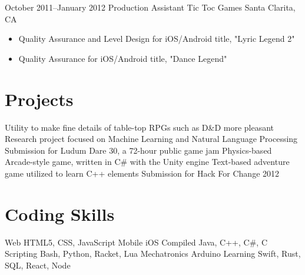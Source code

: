 \documentclass[11pt,a4paper,sans]{moderncv}        %
\begin{document}
\cventry
{October 2011--January 2012}	{Production Assistant}
{Tic Toc Games}	{Santa Clarita, CA}
{}
{
  \begin{itemize}
  \item Quality Assurance and Level Design for iOS/Android title, "Lyric Legend 2"
  \item Quality Assurance for iOS/Android title, "Dance Legend"
  \end{itemize}
}	%

\section{Projects}		%
             {Utility to make fine details of table-top RPGs such as D\&D more pleasant}
			{Research project focused on Machine Learning and Natural Language Processing}
			{Submission for Ludum Dare 30, a 72-hour public game jam}
                         {Physics-based Arcade-style game, written in C\# with the Unity engine}
			{Text-based adventure game utilized to learn C++ elements}
	        {Submission for Hack For Change 2012}

\section{Coding Skills}	%
\cvdoubleitem
{Web}	                {HTML5, CSS, JavaScript}
{Mobile}	        {iOS}
\cvdoubleitem
{Compiled}	        {Java, C++, C\#, C}
{Scripting}		{Bash, Python, Racket, Lua}
\cvdoubleitem
{Mechatronics}	        {Arduino}
{Learning}		{Swift, Rust, SQL, React, Node}
\end{document}
